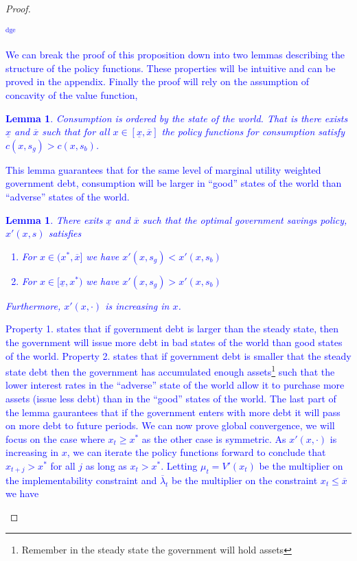 \documentclass[12pt]{article}
\newcommand{\dge}[1]{\textcolor{blue}{$^{\textrm{dge}}${#1}}}
\newtheorem{lemma}[theorem]{Lemma}
\begin{document}
\begin{proof}  \dge{We can break the proof of this proposition down into two lemmas  describing the structure of the policy functions.  These properties will be intuitive and can be proved in the appendix.  Finally the proof will rely on the assumption of concavity of the value function,
\begin{lemma}\label{lem:c_order}  Consumption is ordered by the state of the world.  That is there exists $\underline x$ and $\overline x$ such that for all $x\in[\underline x,\overline x]$ the policy functions for consumption satisfy $c(x,s_g) > c(x,s_b)$.
\end{lemma}  This lemma guarantees that for the same level of marginal utility weighted government debt, consumption will be larger in ``good'' states of the world than ``adverse'' states of the world.
\begin{lemma}\label{lem:x_order}  There exits $\underline x$ and $\overline x$ such that the optimal government savings policy, $x'(x,s)$ satisfies 
\begin{enumerate}
	\item For $x\in(x^*,\overline x]$ we have $x'(x,s_g) < x'(x,s_b)$
	\item  For $x\in[\underline x, x^*)$ we have $x'(x,s_g) > x'(x,s_b)$
\end{enumerate}  Furthermore, $x'(x,\cdot)$ is increasing in $x$.
\end{lemma}  Property 1. states that if government debt is larger than the steady state, then the government will issue more debt in bad states of the world than good states of the world.  Property 2. states that if government debt is smaller that the steady state debt then the government has accumulated enough assets\footnote{Remember in the steady state the government will hold assets} such that the lower interest rates in the ``adverse'' state of the world allow it to purchase more assets (issue less debt) than in the ``good'' states of the world.   The last part of the lemma gaurantees that if the government enters with more debt it will pass on more debt to future periods.  We can now prove global convergence, we will focus on the case where $x_t \geq x^*$ as the other case is symmetric.  As $x'(x,\cdot)$ is increasing in $x$, we can iterate the policy functions forward to conclude that $x_{t+j} > x^*$ for all $j$ as long as $x_t >x ^*$.  Letting $\mu_t = V'(x_t)$ be the multiplier on the 
implementability constraint and $\overline \lambda_t$ be the multiplier on the constraint $x_t \leq \overline x$ we have
}
\end{proof}
\end{document}
